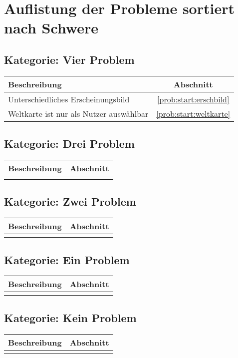 \section{Auflistung der Probleme sortiert nach Schwere}

\subsection*{Kategorie: Vier Problem}
\begin{tabular}{|p{12cm}|c|}
\hline
\textbf{Beschreibung} & \textbf{Abschnitt} \\
\hline\hline
Unterschiedliches Erscheinungsbild & \ref{prob:start:erschbild} \\ 
Weltkarte ist nur als Nutzer auswählbar & \ref{prob:start:weltkarte} \\ 

\hline
\end{tabular}

\subsection*{Kategorie: Drei Problem}
\begin{tabular}{|p{12cm}|c|}
\hline
\textbf{Beschreibung} & \textbf{Abschnitt} \\
\hline\hline
 & \\
\hline

\end{tabular}

\subsection*{Kategorie: Zwei Problem}
\begin{tabular}{|p{12cm}|c|}
\hline
\textbf{Beschreibung} & \textbf{Abschnitt} \\
\hline\hline
 & \\
\hline

\end{tabular}

\subsection*{Kategorie: Ein Problem}
\begin{tabular}{|p{12cm}|c|}
\hline
\textbf{Beschreibung} & \textbf{Abschnitt} \\
\hline\hline
 & \\
\hline
\end{tabular}

\subsection*{Kategorie: Kein Problem}
\begin{tabular}{|p{12cm}|c|}
\hline
\textbf{Beschreibung} & \textbf{Abschnitt} \\
\hline\hline
 & \\
\hline
\end{tabular}
